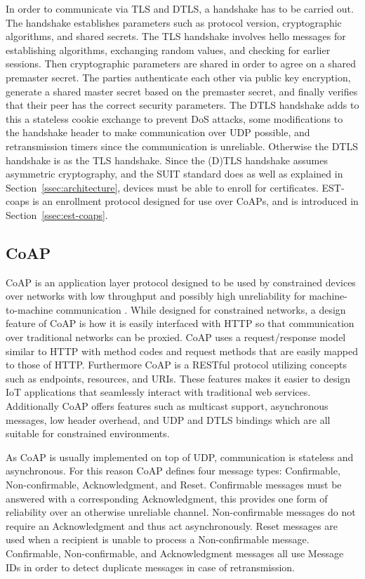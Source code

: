 \documentclass[0-thesis.tex]{subfiles}
\begin{document}
In order to communicate via TLS and DTLS, a handshake has to be carried out. The handshake
establishes parameters such as protocol version, cryptographic algorithms, and shared
secrets. The TLS handshake involves hello messages for establishing algorithms, exchanging
random values, and checking for earlier sessions. Then cryptographic parameters are shared
in order to agree on a shared premaster secret. The parties authenticate each other via
public key encryption, generate a shared master secret based on the premaster secret, and
finally verifies that their peer has the correct security parameters. The DTLS handshake
adds to this a stateless cookie exchange to prevent DoS attacks, some modifications to the
handshake header to make communication over UDP possible, and retransmission timers since
the communication is unreliable. Otherwise the DTLS handshake is as the TLS handshake.
Since the (D)TLS handshake assumes asymmetric cryptography, and the SUIT standard does as
well as explained in Section~\ref{ssec:architecture}, devices must be able to enroll for
certificates. EST-coaps is an enrollment protocol designed for use over CoAPs, and is
introduced in Section~\ref{ssec:est-coaps}.

\subsection{CoAP}
\label{ssec:coap}
CoAP is an application layer protocol designed to be used by constrained devices over
networks with low throughput and possibly high unreliability for machine-to-machine
communication \parencite{rfc7252}. While designed for constrained networks, a design
feature of CoAP is how it is easily interfaced with HTTP so that communication over
traditional networks can be proxied. CoAP uses a request/response model similar to HTTP
with method codes and request methods that are easily mapped to those of HTTP. Furthermore
CoAP is a RESTful protocol utilizing concepts such as endpoints, resources, and URIs.
These features makes it easier to design IoT applications that seamlessly interact with
traditional web services. Additionally CoAP offers features such as multicast support,
asynchronous messages, low header overhead, and UDP and DTLS bindings which are all
suitable for constrained environments.

As CoAP is usually implemented on top of UDP, communication is stateless and asynchronous.
For this reason CoAP defines four message types: Confirmable, Non-confirmable,
Acknowledgment, and Reset. Confirmable messages must be answered with a corresponding
Acknowledgment, this provides one form of reliability over an otherwise unreliable
channel. Non-confirmable messages do not require an Acknowledgment and thus act
asynchronously. Reset messages are used when a recipient is unable to process a
Non-confirmable message. Confirmable, Non-confirmable, and Acknowledgment messages all use
Message IDs in order to detect duplicate messages in case of retransmission.
\end{document}
